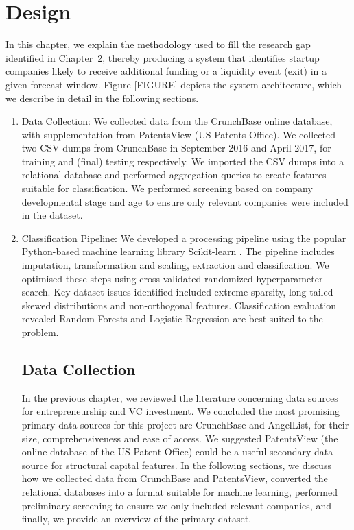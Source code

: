 \documentclass[../thesis/thesis.tex]{subfiles}
\begin{document}
 \chapter{Design}


In this chapter, we explain the methodology used to fill the research gap identified in Chapter~2, thereby producing a system that identifies startup companies likely to receive additional funding or a liquidity event (exit) in a given forecast window. Figure [FIGURE] depicts the system architecture, which we describe in detail in the following sections.

\begin{enumerate}

\item Data Collection: We collected data from the CrunchBase online database, with supplementation from PatentsView (US Patents Office). We collected two CSV dumps from CrunchBase in September 2016 and April 2017, for training and (final) testing respectively. We imported the CSV dumps into a relational database and performed aggregation queries to create features suitable for classification. We performed screening based on company developmental stage and age to ensure only relevant companies were included in the dataset.

\item Classification Pipeline: We developed a processing pipeline using the popular Python-based machine learning library Scikit-learn \cite{pedregosa2011}. The pipeline includes imputation, transformation and scaling, extraction and classification. We optimised these steps using cross-validated randomized hyperparameter search. Key dataset issues identified included extreme sparsity, long-tailed skewed distributions and non-orthogonal features. Classification evaluation revealed Random Forests and Logistic Regression are best suited to the problem.

\section{Data Collection}

In the previous chapter, we reviewed the literature concerning data sources for entrepreneurship and VC investment. We concluded the most promising primary data sources for this project are CrunchBase and AngelList, for their size, comprehensiveness and ease of access. We suggested PatentsView (the online database of the US Patent Office) could be a useful secondary data source for structural capital features. In the following sections, we discuss how we collected data from CrunchBase and PatentsView, converted the relational databases into a format suitable for machine learning, performed preliminary screening to ensure we only included relevant companies, and finally, we provide an overview of the primary dataset.


\end{enumerate}
\end{document}
